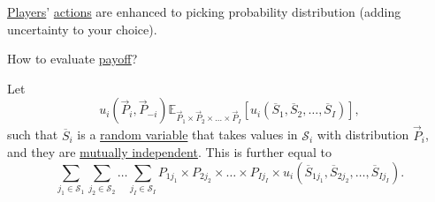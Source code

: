 \hyperref[def:player]{Players}' \hyperref[def:strategy]{actions} are enhanced to picking probability distribution (adding uncertainty to your choice).

\begin{problem}
How to evaluate \hyperref[def:reward]{payoff}?
\end{problem}
\begin{answer}
	Let
	\[
		u_{i}(\overrightarrow{P}_i, \overrightarrow{P}_{-i})
		\mathbb{E}_{\overrightarrow{P}_{1}\times \overrightarrow{P}_2 \times \dots \times \overrightarrow{P}_I}\left[ u_{i}\left(\overline{S}_1, \overline{S}_2, \dots , \overline{S}_I\right)\right],
	\]
	such that \(\overline{S}_i\) is a \hyperref[def:random-variable]{random variable} that takes values in \(\mathcal{S}_i\) with distribution \(\overrightarrow{P}_i\), and they are \hyperref[def:independent]{mutually independent}. This is further equal to
	\[
		\sum\limits_{j_1\in \mathcal{S}_1 }\sum\limits_{j_2\in \mathcal{S}_2}\dots \sum\limits_{j_I\in \mathcal{S}_I }P_{1j_1}\times P_{2j_2}\times \dots \times P_{Ij_I}\times u_{i}\left(\overline{S}_{1j_1}, \overline{S}_{2j_2}, \dots , \overline{S}_{Ij_I}\right).
	\]
\end{answer}

